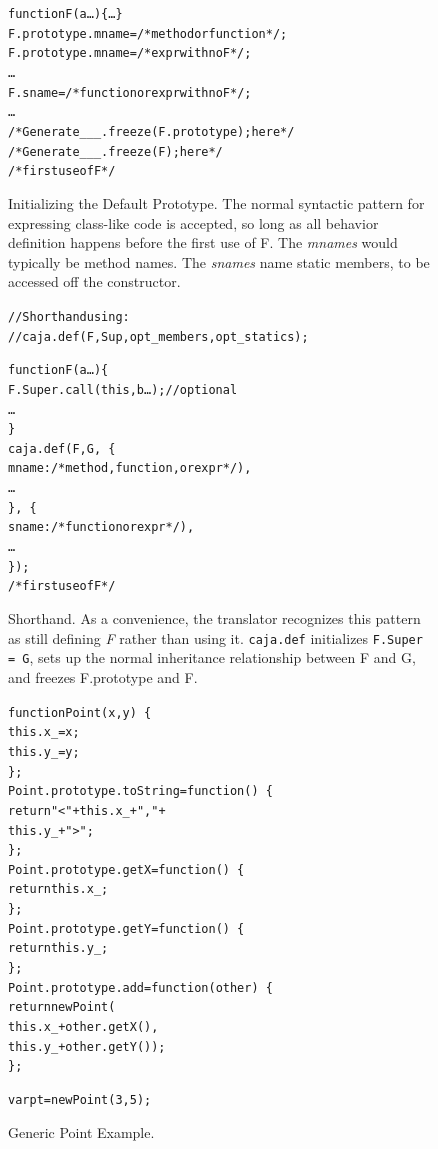 \documentclass[letterpaper,twocolumn,10pt]{article}
\newcommand{\code}[1]{{\tt {#1}}}              %
\begin{document}
\begin{figure}
\begin{alltt}
function F(a\ldots)\{\ldots\}
F.prototype.mname = /*method or function*/;
F.prototype.mname = /*expr with no F*/;
\ldots
F.sname = /*function or expr with no F*/;
\ldots
/*Generate \_\_\_.freeze(F.prototype); here*/
/*Generate \_\_\_.freeze(F); here*/
/*first use of F*/
\end{alltt}

\caption[Initializing the Default Prototype]{Initializing the Default
Prototype. The normal syntactic pattern for expressing class-like code is
accepted, so long as all behavior definition happens before the first use of
F. The \emph{mnames} would typically be method names. The \emph{snames} name
static members, to be accessed off the constructor.}
\label{fig:use-proto}
\end{figure}


\begin{figure}
\begin{alltt}
// Shorthand using:
// caja.def(F,Sup,opt_members,opt_statics);

function F(a\ldots)\{
  F.Super.call(this,b\ldots); //optional
  \ldots
\}
caja.def(F, G,\ \{
  mname: /*method, function, or expr*/),
  \ldots
\},\ \{
  sname: /*function or expr*/),
  \ldots
\});
/*first use of F*/
\end{alltt}

\caption[Shorthand.]{Shorthand. As a convenience, the translator recognizes 
this pattern as still defining \emph{F} rather than using it. \code{caja.def}
initializes \code{F.Super = G}, sets up the normal inheritance relationship
between F and G, and freezes F.prototype and F.}
\label{fig:shorthand}
\end{figure}



\begin{figure}
\begin{alltt}
function Point(x, y)\ \{
  this.x\_ = x;
  this.y\_ = y;
\};
Point.prototype.toString = function()\ \{ 
  return "<" + this.x\_ + "," + 
               this.y\_ + ">"; 
\};
Point.prototype.getX = function()\ \{ 
  return this.x\_; 
\};
Point.prototype.getY = function()\ \{ 
  return this.y\_; 
\};
Point.prototype.add = function(other)\ \{
  return new Point(
    this.x\_ + other.getX(),
    this.y\_ + other.getY());
\};

var pt = new Point(3, 5);
\end{alltt}

\caption[Generic Point Example.]{Generic Point Example.}
\label{fig:generic-point}
\end{figure}
\end{document}

